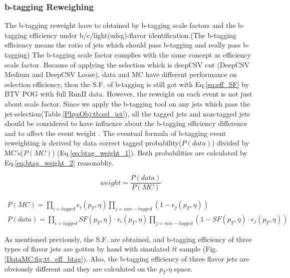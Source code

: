 		\subsubsection{b-tagging Reweighing}
		\label{sssec:DataAndMC_btagSF}

			The b-tagging reweight have to obtained by b-tagging scale factors and the b-tagging efficiency under b/c/light(udsg)-flavor identification.(The b-tagging efficiency means the ratio of jets which should pass b-tagging and really pass b-tagging) The b-tagging scale factor complies with the same concept as efficiency scale factor. Because of applying the selection which is deepCSV cut (DeepCSV Medium and DeepCSV Loose), data and MC have different performance on selection efficiency, then the S.F. of b-tagging is still got with Eq.\ref{eq:eff_SF} by BTV POG\cite{btvpog_twiki} with full RunII data. However, the reweight on each event is not just about scale factor. Since we apply the b-tagging tool on any jets which pass the jet-selection(Table.\ref{PhysObj:tb:sel_jet}), all the tagged jets and non-tagged jets should be considered to have influence about the b-tagging efficiency difference and to affect the event weight \cite{btagreweight_twiki}. The eventual formula of b-tagging event reweighting is derived by data correct tagged probability($P(data)$) divided by MC's($P(MC)$) (Eq.\ref{eq:btag_weight_1}). Both probabilities are calculated by Eq.\ref{eq:btag_weight_2} reasonabliy. 

			\begin{equation}
			weight = \frac{P(data)}{P(MC)}
			\label{eq:btag_weight_1}
			\end{equation}

			\begin{equation}
			\begin{split}
			P(MC) = \prod_{i=tagged} \epsilon_i(p_T,\eta) \prod_{j=non-tagged} (1-\epsilon_j(p_T,\eta)) \;\;\;\;\;\;\;\;\;\;\;\;\;\;\; \\
			P(data) = \prod_{i=tagged} SF(p_T,\eta) \cdot \epsilon_i(p_T,\eta) \prod_{j=non-tagged} (1- SF(p_T,\eta) \cdot \epsilon_j(p_T,\eta))
			\label{eq:btag_weight_2}
			\end{split}
			\end{equation}

			As mentioned previously, the S.F. are obtained, and b-tagging efficiency of three types of flavor jets are gotten by hand with simulated $t\bar{t}$ sample (Fig.\ref{DataMC:fig:tt_eff_btag}). Also, the b-tagging efficiency of three flavor jets are obviously different and they are calculated on the $p_T$-$\eta$ space.

